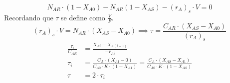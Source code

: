\begin{equation*}
	N_{AR}\cdot (1-X_{A0}) - N_{AR}(1-X_{AS}) - (r_A)_s \cdot V = 0
\end{equation*}
\vspace{1.5em}
\noindent Recordando que $\tau$ se define como $\frac{V}{F}$.
\begin{equation*}
	(r_A)_s \cdot V = N_{AR}\cdot (X_{AS}-X_{A0}) \implies \tau = \frac{C_{AR}\cdot (X_{AS}- X_{A0})}{(r_A)_s}
\end{equation*}
\begin{align*}
	\frac{\tau_i}{C_{AR}} & = \frac{X_{Ai}-X_{A(i-1)}}{-r_{Ai}}                                                                                              \\[6pt]
	\tau_i                & = \frac{C_A \cdot (X_{A1}-0)}{C_{A0}\cdot K \cdot (1-X_{A1})} = \frac{C_A \cdot (X_{AS}-X_{A1})}{C_{A0}\cdot K \cdot (1-X_{AS})} \\[6pt]
	\tau                  & = 2 \cdot \tau_i
\end{align*}
